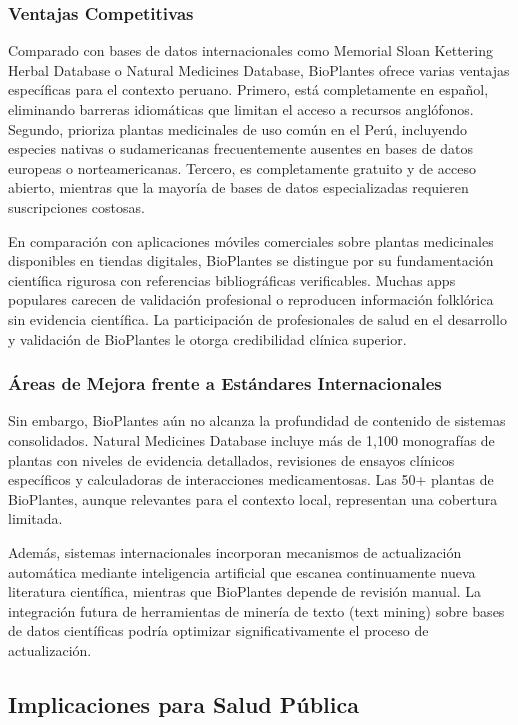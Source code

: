\documentclass[12pt,a4paper]{article}
\begin{document}
\subsubsection{Ventajas Competitivas}

Comparado con bases de datos internacionales como Memorial Sloan Kettering Herbal Database o Natural Medicines Database, BioPlantes ofrece varias ventajas específicas para el contexto peruano. Primero, está completamente en español, eliminando barreras idiomáticas que limitan el acceso a recursos anglófonos. Segundo, prioriza plantas medicinales de uso común en el Perú, incluyendo especies nativas o sudamericanas frecuentemente ausentes en bases de datos europeas o norteamericanas. Tercero, es completamente gratuito y de acceso abierto, mientras que la mayoría de bases de datos especializadas requieren suscripciones costosas.

En comparación con aplicaciones móviles comerciales sobre plantas medicinales disponibles en tiendas digitales, BioPlantes se distingue por su fundamentación científica rigurosa con referencias bibliográficas verificables. Muchas apps populares carecen de validación profesional o reproducen información folklórica sin evidencia científica. La participación de profesionales de salud en el desarrollo y validación de BioPlantes le otorga credibilidad clínica superior.

\subsubsection{Áreas de Mejora frente a Estándares Internacionales}

Sin embargo, BioPlantes aún no alcanza la profundidad de contenido de sistemas consolidados. Natural Medicines Database incluye más de 1,100 monografías de plantas con niveles de evidencia detallados, revisiones de ensayos clínicos específicos y calculadoras de interacciones medicamentosas. Las 50+ plantas de BioPlantes, aunque relevantes para el contexto local, representan una cobertura limitada.

Además, sistemas internacionales incorporan mecanismos de actualización automática mediante inteligencia artificial que escanea continuamente nueva literatura científica, mientras que BioPlantes depende de revisión manual. La integración futura de herramientas de minería de texto (text mining) sobre bases de datos científicas podría optimizar significativamente el proceso de actualización.

\subsection{Implicaciones para Salud Pública}
\end{document}
